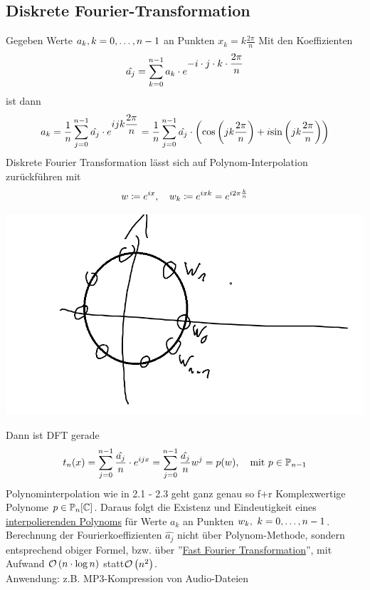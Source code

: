 \subsection{Diskrete Fourier-Transformation}
Gegeben Werte \(a_k, k = 0,\dots, n-1\) an Punkten \(x_k = k\frac{2\pi}{n}\) Mit den Koeffizienten \[
    \hat{a_j} = \displaystyle\sum_{k=0}^{n-1}a_k\cdot e^{\displaystyle-i\cdot j \cdot k \cdot\frac{2\pi}{n}}
\]
ist dann \[
    a_k = \frac{1}{n}\dsum_{j=0}^{n-1}\displaystyle{\hat{a_j}\cdot e^{\displaystyle ijk\frac{2\pi}{n}}} = 
    \frac{1}{n}\dsum_{j=0}^{n-1} \hat{a_j}\cdot\left(\cos{jk\frac{2\pi}{n}}+ i\sin{jk\frac{2\pi}{n}}\right)
\]
Diskrete Fourier Transformation lässt sich auf Polynom-Interpolation zurückführen mit \[
    w\coloneqq e^{ix}, \hspace{1em} w_k \coloneqq e^{ixk} = e^{i2\pi \frac{k}{n} }
\]
\begin{center}
    \includegraphics[width=\linewidth]{Bilder/231122_1.png}
\end{center}
Dann ist DFT gerade \[
    t_n(x) = \displaystyle\sum_{j=0}^{n-1}\frac{\hat{a_j}}{n}\cdot e^{ijx} = \displaystyle\sum_{j=0}^{n-1}\frac{\hat{a_j}}{n}w^j = p(w), 
    \hspace{1em} \text{mit } p\in \mathbb{P}_{n-1}
\]
Polynominterpolation wie in 2.1 - 2.3 geht ganz genau so f+r Komplexwertige Polynome \(p\in\mathbb{P}_n[\mathbb{C}]\). Daraus folgt
die Existenz und Eindeutigkeit eines \underline{interpolierenden Polynoms} für Werte \(a_k\) an Punkten \(w_k, \ k = 0,\dots, n-1\). Berechnung der Fourierkoeffizienten \(\hat{a_j}\) nicht über Polynom-Methode, sondern entsprechend obiger Formel,
bzw. über ''\underline{Fast Fourier Transformation}'', mit Aufwand \(\calO{n\cdot\log n}\) statt\(\calO{n^2}\). \\
Anwendung: z.B. MP3-Kompression von Audio-Dateien